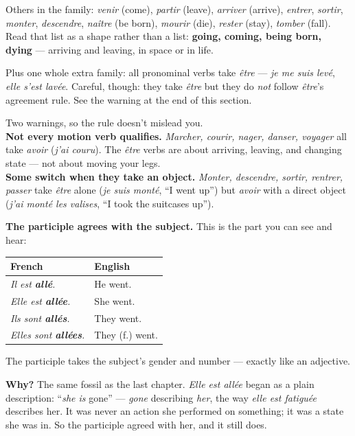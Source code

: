 Others in the family: \emph{venir} (come), \emph{partir} (leave),
\emph{arriver} (arrive), \emph{entrer}, \emph{sortir}, \emph{monter},
\emph{descendre}, \emph{na\^{i}tre} (be born), \emph{mourir} (die),
\emph{rester} (stay), \emph{tomber} (fall). Read that list as a shape rather
than a list: \textbf{going, coming, being born, dying} --- arriving and leaving,
in space or in life.

Plus one whole extra family: all pronominal verbs take \emph{\^{e}tre} ---
\emph{je me suis lev\'{e}}, \emph{elle s'est lav\'{e}e}. Careful, though: they
take \emph{\^{e}tre} but they do \emph{not} follow \emph{\^{e}tre}'s agreement
rule. See the warning at the end of this section.

\begin{grammarlens}
Two warnings, so the rule doesn't mislead you.\\[3pt]
\textbf{Not every motion verb qualifies.} \emph{Marcher, courir, nager, danser,
voyager} all take \emph{avoir} (\emph{j'ai couru}). The \emph{\^{e}tre} verbs
are about arriving, leaving, and changing state --- not about moving your
legs.\\[3pt]
\textbf{Some switch when they take an object.} \emph{Monter, descendre, sortir,
rentrer, passer} take \emph{\^{e}tre} alone (\emph{je suis mont\'{e}}, ``I went
up'') but \emph{avoir} with a direct object (\emph{j'ai mont\'{e} les valises},
``I took the suitcases up'').
\end{grammarlens}

\textbf{The participle agrees with the subject.} This is the part you can see
and hear:

\begin{center}
\begin{tabular}{@{}ll@{}}
\toprule
French & English \\
\midrule
\emph{Il est \textbf{all\'{e}}.} & He went. \\
\emph{Elle est \textbf{all\'{e}e}.} & She went. \\
\emph{Ils sont \textbf{all\'{e}s}.} & They went. \\
\emph{Elles sont \textbf{all\'{e}es}.} & They (f.) went. \\
\bottomrule
\end{tabular}
\end{center}

The participle takes the subject's gender and number --- exactly like an
adjective.

\begin{grammarlens}
\textbf{Why?} The same fossil as the last chapter. \emph{Elle est all\'{e}e}
began as a plain description: ``\emph{she is} gone'' --- \emph{gone} describing
\emph{her}, the way \emph{elle est fatigu\'{e}e} describes her. It was never an
action she performed on something; it was a state she was in. So the participle
agreed with her, and it still does.
\end{grammarlens}

